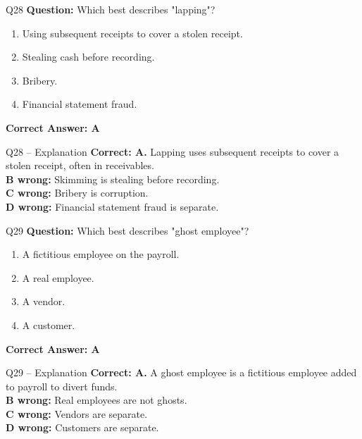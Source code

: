 \documentclass[aspectratio=169,10pt]{beamer}
\begin{document}
	\begin{frame}[t]{Q28}
		\small
		\textbf{Question:} Which best describes "lapping"?
		\begin{enumerate}[label=\Alph*.,itemsep=1pt,topsep=2pt]
			\item Using subsequent receipts to cover a stolen receipt.
			\item Stealing cash before recording.
			\item Bribery.
			\item Financial statement fraud.
		\end{enumerate}
		\vspace{4pt}
		\textbf{Correct Answer: A}
	\end{frame}
	
	\begin{frame}[t]{Q28 -- Explanation}
		\small
		\textbf{Correct: A.} Lapping uses subsequent receipts to cover a stolen receipt, often in receivables. \\[4pt]
		\textbf{B wrong:} Skimming is stealing before recording. \\[2pt]
		\textbf{C wrong:} Bribery is corruption. \\[2pt]
		\textbf{D wrong:} Financial statement fraud is separate.
	\end{frame}
	
	\begin{frame}[t]{Q29}
		\small
		\textbf{Question:} Which best describes "ghost employee"?
		\begin{enumerate}[label=\Alph*.,itemsep=1pt,topsep=2pt]
			\item A fictitious employee on the payroll.
			\item A real employee.
			\item A vendor.
			\item A customer.
		\end{enumerate}
		\vspace{4pt}
		\textbf{Correct Answer: A}
	\end{frame}
	
	\begin{frame}[t]{Q29 -- Explanation}
		\small
		\textbf{Correct: A.} A ghost employee is a fictitious employee added to payroll to divert funds. \\[4pt]
		\textbf{B wrong:} Real employees are not ghosts. \\[2pt]
		\textbf{C wrong:} Vendors are separate. \\[2pt]
		\textbf{D wrong:} Customers are separate.
	\end{frame}
	
\end{document}

